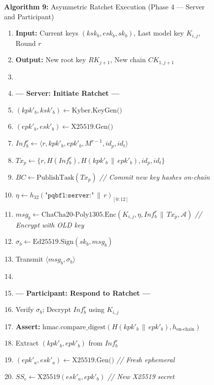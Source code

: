 \documentclass[journal, 10pt, twocolumn]{IEEEtran}
\begin{document}
\begin{figure}[!t]
\hrulefill
\vspace{-0.2cm}
\begin{center}
\textbf{Algorithm 9:} Asymmetric Ratchet Execution (Phase 4 --- Server and Participant)
\end{center}
\vspace{-0.2cm}
\hrulefill
\begin{enumerate}
    \item \textbf{Input:} Current keys $(ksk_b, esk_b, sk_b)$, Last model key $K_{i,j}$, Round $r$
    \item \textbf{Output:} New root key $RK_{j+1}$, New chain $CK_{1,j+1}$
    \item[]
    \item[] \textbf{--- Server: Initiate Ratchet ---}
    \item $(kpk'_b, ksk'_b) \leftarrow \text{Kyber.KeyGen()}$
    \item $(epk'_b, esk'_b) \leftarrow \text{X25519.Gen()}$
    \item $Inf_b^r \leftarrow \langle r, kpk'_b, epk'_b, M^{r-1}, id_p, id_t \rangle$
    \item $Tx_p \leftarrow \{r, H(Inf_b^r), H(kpk'_b \,\|\, epk'_b), id_p, id_t\}$
    \item $BC \leftarrow \text{PublishTask}(Tx_p)$ \quad \textit{// Commit new key hashes on-chain}
    \item $\eta \leftarrow h_{32}(\texttt{"pqbfl:server:"} \,\|\, r)_{[0:12]}$
    \item $msg_b \leftarrow \text{ChaCha20-Poly1305.Enc}(K_{i,j}, \eta, Inf_b^r \,\|\, Tx_p, \mathcal{A})$ \quad \textit{// Encrypt with OLD key}
    \item $\sigma_b \leftarrow \text{Ed25519.Sign}(sk_b, msg_b)$
    \item Transmit $\langle msg_b, \sigma_b \rangle$
    \item[]
    \item[] \textbf{--- Participant: Respond to Ratchet ---}
    \item Verify $\sigma_b$; Decrypt $Inf_b^r$ using $K_{i,j}$
    \item \textbf{Assert:} $\text{hmac.compare\_digest}(H(kpk'_b \,\|\, epk'_b), h_{\text{on-chain}})$
    \item Extract $(kpk'_b, epk'_b)$ from $Inf_b^r$
    \item $(epk'_a, esk'_a) \leftarrow \text{X25519.Gen()}$ \quad \textit{// Fresh ephemeral}
    \item $SS_e \leftarrow \text{X25519}(esk'_a, epk'_b)$ \quad  \textit{// New X25519 secret}

\end{enumerate}
\end{figure}
\end{document}
